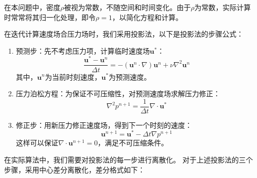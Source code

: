 \documentclass[12pt,a4paper]{article}
\begin{document}
在本问题中，密度$\rho$被视为常数，不随空间和时间变化。由于$\rho$为常数，实际计算时常常将其归一化处理，即令$\rho=1$，以简化方程和计算。

在迭代计算速度场合压力场时，我们采用投影法，以下是投影法的步骤公式：
\begin{enumerate}
    \item 预测步：先不考虑压力项，计算临时速度场$\mathbf{u}^*$：
    \begin{equation}
        \frac{\mathbf{u}^* - \mathbf{u}^n}{\Delta t} = -(\mathbf{u}^n \cdot \nabla)\mathbf{u}^n + \nu \nabla^2 \mathbf{u}^n
    \end{equation}
    其中，$\mathbf{u}^n$为当前时刻速度，$\mathbf{u}^*$为预测速度。

    \item 压力泊松方程：为保证不可压缩性，对预测速度场求解压力修正：
    \begin{equation}
        \nabla^2 p^{n+1} = \frac{1}{\Delta t} \nabla \cdot \mathbf{u}^*
    \end{equation}

    \item 修正步：用新压力修正速度场，得到下一个时刻的速度：
    \begin{equation}
        \mathbf{u}^{n+1} = \mathbf{u}^* - \Delta t \nabla p^{n+1}
    \end{equation}
    这样可以保证$\nabla \cdot \mathbf{u}^{n+1} = 0$，满足不可压缩条件。
\end{enumerate}

在实际算法中，我们需要对投影法的每一步进行离散化。
对于上述投影法的三个步骤，采用中心差分离散化，差分格式如下：
\end{document}
